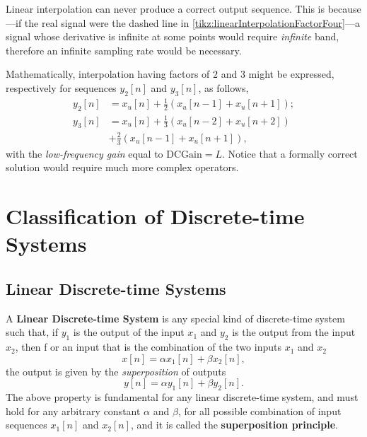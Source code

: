 \documentclass[\documentfontsize, twocolumn]{\classname}
\begin{document}
\begin{figure*}[ht]
\begin{center}
    \end{center}\caption{Interpolation of a signal $x[n]$ with factor of $4$. From top to bottom: $(a)$ original signal $x[n]$, $(b)$ upsampled version $x_u[n]$ and $(c)$ interpolated output sequence $y[n]$.}\label{tikz:linearInterpolationFactorFour}
\end{figure*}

Linear interpolation can never produce a correct output sequence. This is because---if the real signal were the dashed line in \ref{tikz:linearInterpolationFactorFour}---a signal whose derivative is infinite at some points would require \emph{infinite} band, therefore an infinite sampling rate would be necessary.

Mathematically, interpolation having factors of $2$ and $3$ might be expressed, respectively for sequences $y_2[n]$ and $y_3[n]$, as follows,
\begin{align*}
    y_2[n] &= x_u[n] + \frac 1 2(x_u[n-1] + x_u[n+1]);\\
    y_3[n] &= x_u[n] + \frac 1 3(x_u[n-2] + x_u[n+2])\\
           &+ \frac 2 3(x_u[n-1] + x_u[n+1]),
\end{align*}
with the \emph{low-frequency gain} equal to $\mbox{DCGain} = L$. Notice that a formally correct solution would require much more complex operators.

\clearpage

\section{Classification of Discrete-time Systems}

\subsection{Linear Discrete-time Systems}

A \textbf{Linear Discrete-time System} is any special kind of discrete-time system such that, if $y_1$ is the output of the input $x_1$ and $y_2$ is the output from the input $x_2$, then f or an input that is the combination of the two inputs $x_1$ and $x_2$
\begin{equation*}
    x[n] = \alpha x_1[n] + \beta x_2[n],
\end{equation*}
the output is given by the \emph{superposition} of outputs
\begin{equation}\label{eqn:linearDiscreteTimeSystem}
    y[n] = \alpha y_1[n] + \beta y_2[n].
\end{equation}
The above property is fundamental for any linear discrete-time system, and must hold for any arbitrary constant $\alpha$ and $\beta$, for all possible combination of input sequences $x_1[n]$ and $x_2[n]$, and it is called the \textbf{superposition principle}.
\end{document}
